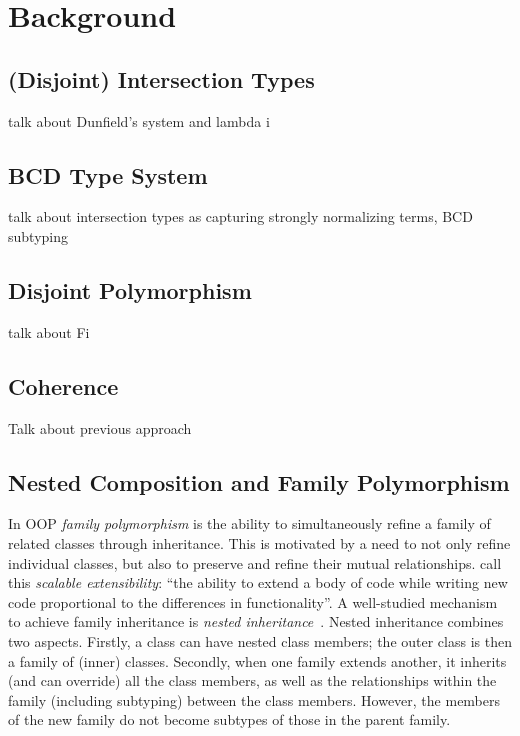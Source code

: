 
\chapter{Background}
\label{chap:background}



\section{(Disjoint) Intersection Types}
\label{bg:sec:intersection}

talk about Dunfield's system and lambda i

\section{BCD Type System}

talk about intersection types as capturing  strongly normalizing terms, BCD subtyping

\section{Disjoint Polymorphism}

talk about Fi

\section{Coherence}

Talk about previous approach


\section{Nested Composition and Family Polymorphism}


In OOP \emph{family polymorphism} is the ability to
simultaneously refine a family of related classes through inheritance. This is
motivated by a need to not only refine individual classes, but also to preserve
and refine their mutual relationships. \citet{Nystrom_2004} call this
\emph{scalable extensibility}: ``the ability to extend a body of code while
writing new code proportional to the differences in functionality''.
%
A well-studied mechanism to achieve family inheritance is \emph{nested
inheritance}~\citep{Nystrom_2004}. Nested inheritance combines two aspects.
Firstly, a class can have nested class members; the outer class is then a
family of (inner) classes. Secondly, when one family extends another, it
inherits (and can override) all the class members, as well as the relationships
within the family (including subtyping) between the class members. However,
the members of the new family do not become subtypes of those in the parent family.

